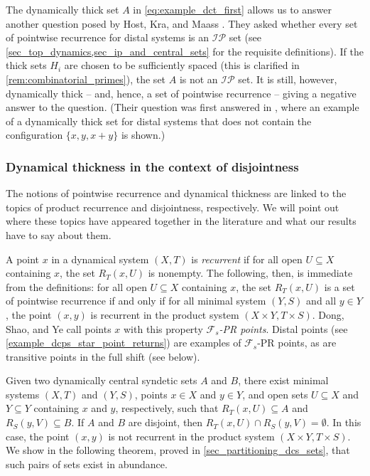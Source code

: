 \documentclass[letter,11pt]{article}
\theoremstyle{plain}
\theoremstyle{definition}
\theoremstyle{plain}
\theoremstyle{plain}
\numberwithin{equation}{section}
\newcommand{\IP}{\mathcal{IP}}
\begin{document}
The dynamically thick set $A$ in \eqref{eq:example_dct_first} allows us to answer another question posed by Host, Kra, and Maass \cite[Question 3.11]{HostKraMaass2016}. They asked whether every set of pointwise recurrence for distal systems is an $\IP$ set (see \cref{sec_top_dynamics,sec_ip_and_central_sets} for the requisite definitions).  If the thick sets $H_i$ are chosen to be sufficiently spaced (this is clarified in \cref{rem:combinatorial_primes}), the set $A$ is not an $\IP$ set. It is still, however, dynamically thick -- and, hence, a set of pointwise recurrence -- giving a negative answer to the question.  (Their question was first answered in \cite{Koutsogiannis_Le_Moreira_Pavlov_Richter_interpolation_sets}, where an example of a dynamically thick set for distal systems that does not contain the configuration $\{x,y,x+y\}$ is shown.)



\subsubsection{Dynamical thickness in the context of disjointness}
\label{sec_intro_disjointness}

The notions of pointwise recurrence and dynamical thickness are linked to the topics of product recurrence and disjointness, respectively.  We will point out where these topics have appeared together in the literature and what our results have to say about them.

A point $x$ in a dynamical system $(X,T)$ is \emph{recurrent} if for all open $U \subseteq X$ containing $x$, the set $R_T(x,U)$ is nonempty.  The following, then, is immediate from the definitions: for all open $U \subseteq X$ containing $x$, the set $R_T(x,U)$ is a set of pointwise recurrence if and only if for all minimal system $(Y,S)$ and all $y \in Y$, the point $(x,y)$ is recurrent in the product system $(X \times Y, T \times S)$. Dong, Shao, and Ye \cite{dong_shao_ye_2012} call points $x$ with this property \emph{$\mathcal{F}_s$-PR points}.  Distal points (see \cref{example_dcps_star_point_returns}) are examples of $\mathcal{F}_s$-PR points, as are transitive points in the full shift (see below).

Given two dynamically central syndetic sets $A$ and $B$, there exist minimal systems $(X,T)$ and $(Y,S)$, points $x \in X$ and $y \in Y$, and open sets $U \subseteq X$ and $Y \subseteq Y$ containing $x$ and $y$, respectively, such that $R_T(x,U) \subseteq A$ and $R_S(y,V) \subseteq B$.  If $A$ and $B$ are disjoint, then $R_T(x,U) \cap R_S(y,V) = \emptyset$. In this case, the point $(x,y)$ is not recurrent in the product system $(X \times Y, T \times S)$.  We show in the following theorem, proved in \cref{sec_partitioning_dcs_sets}, that such pairs of sets exist in abundance.
\end{document}
